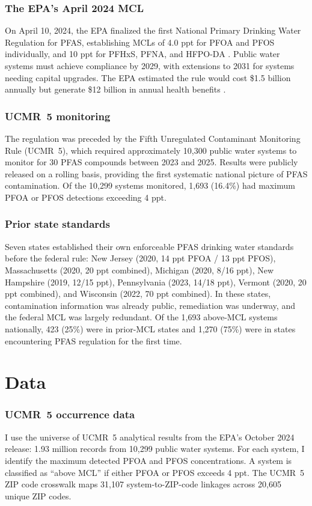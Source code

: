 \documentclass[12pt]{article}
\begin{document}
\subsubsection*{The EPA's April 2024 MCL} On April 10, 2024, the EPA finalized the first National Primary Drinking Water Regulation for PFAS, establishing MCLs of 4.0 ppt for PFOA and PFOS individually, and 10 ppt for PFHxS, PFNA, and HFPO-DA \citep{EPA2024PFAS}. Public water systems must achieve compliance by 2029, with extensions to 2031 for systems needing capital upgrades. The EPA estimated the rule would cost \$1.5 billion annually but generate \$12 billion in annual health benefits \citep{EPA2024RIA}.

\subsubsection*{UCMR~5 monitoring} The regulation was preceded by the Fifth Unregulated Contaminant Monitoring Rule (UCMR~5), which required approximately 10,300 public water systems to monitor for 30 PFAS compounds between 2023 and 2025. Results were publicly released on a rolling basis, providing the first systematic national picture of PFAS contamination. Of the 10,299 systems monitored, 1,693 (16.4\%) had maximum PFOA or PFOS detections exceeding 4 ppt.

\subsubsection*{Prior state standards} Seven states established their own enforceable PFAS drinking water standards before the federal rule: New Jersey (2020, 14 ppt PFOA / 13 ppt PFOS), Massachusetts (2020, 20 ppt combined), Michigan (2020, 8/16 ppt), New Hampshire (2019, 12/15 ppt), Pennsylvania (2023, 14/18 ppt), Vermont (2020, 20 ppt combined), and Wisconsin (2022, 70 ppt combined). In these states, contamination information was already public, remediation was underway, and the federal MCL was largely redundant. Of the 1,693 above-MCL systems nationally, 423 (25\%) were in prior-MCL states and 1,270 (75\%) were in states encountering PFAS regulation for the first time.

\section{Data}

\subsubsection*{UCMR~5 occurrence data} I use the universe of UCMR~5 analytical results from the EPA's October 2024 release: 1.93 million records from 10,299 public water systems. For each system, I identify the maximum detected PFOA and PFOS concentrations. A system is classified as ``above MCL'' if either PFOA or PFOS exceeds 4 ppt. The UCMR~5 ZIP code crosswalk maps 31,107 system-to-ZIP-code linkages across 20,605 unique ZIP codes.
\end{document}
